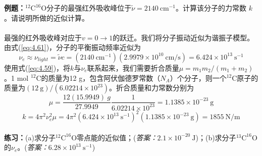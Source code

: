     \begin{examplebox}
        \textbf{例题：}$^{12}\mathrm{C}^{16}\mathrm{O}$分子的最强红外吸收峰位于$\tilde{\nu} = 2140 \:\mathrm{cm}^{-1}$。计算该分子的力常数 $k$。请说明所做的近似计算。\\
        \\
        最强的红外吸收峰对应于$v = 0 \to 1$的跃迁。我们将分子振动近似为谐振子模型。由式(\ref{eq:4.61})，分子的平衡振动频率近似为
        \begin{equation*}
            \nu_e \approx \nu_{light} = \tilde{\nu}c = \left(2140 \:\mathrm{cm}^{-1}\right)\left(2.9979 \times 10^{10} \:\mathrm{cm/s}\right)  = 6.424 \times 10^{13} \:\mathrm{s}^{-1}
        \end{equation*}
        使用式(\ref{eq:4.59})，将$k$与$\nu_e$联系起来，我们需要折合质量$\mu = m_1m_2/\left(m_1+m_2\right)$。1 mol $^{12}\mathrm{C}$的质量为12 g，包含阿伏伽德罗常数（$N_A$）个分子，则一个$^{12}\mathrm{C}$原子的质量为$\left(12 \: \mathrm{g} \right)/ \left(6.02214 \times 10^{23}\right)$。折合质量和力常数分别为
        \begin{equation*}
            \mu = \frac{12 \left(15.9949\right)\: g}{27.9949} \frac{1}{6.02214 \times 10^{23}} = 1.1385 \times 10^{-23} \:\mathrm{g}
        \end{equation*}
        \begin{equation*}
            k = 4\pi^2 \nu_e^2\mu = 4\pi^2 \left(6.424 \times 10^{13} \:\mathrm{s}^{-1}\right)^2\left(1.1385 \times 10^{-23} \:\mathrm{g}\right) = 1855 \: \mathrm{N} / \mathrm{m}
        \end{equation*}
        \\
        \textbf{练习：}(a)求分子$^{12}\mathrm{C}^{16}\mathrm{O}$零点能的近似值；(\textit{答案：}$2.1 \times 10^{-20} \:\mathrm{J}$)；(b)求分子$^{13}\mathrm{C}^{16}\mathrm{O}$的$\nu_e$。(\textit{答案：}$6.28 \times 10^{13} \:\mathrm{s}^{-1}$)
    \end{examplebox}

